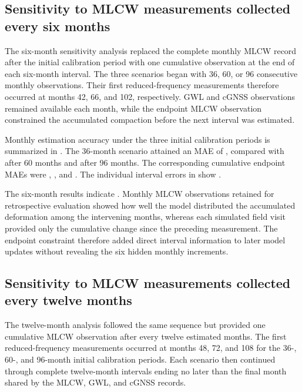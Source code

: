 \subsection{Sensitivity to MLCW measurements collected every six months}
\label{subsec:discussion_reduced_sampling}
\label{subsec:results_sparse_h6}

The six-month sensitivity analysis replaced the complete monthly MLCW record after the initial calibration period with one cumulative observation at the end of each six-month interval. The three scenarios began with 36, 60, or 96 consecutive monthly observations. Their first reduced-frequency measurements therefore occurred at months 42, 66, and 102, respectively. GWL and cGNSS observations remained available each month, while the endpoint MLCW observation constrained the accumulated compaction before the next interval was estimated.

Monthly estimation accuracy under the three initial calibration periods is summarized in . The 36-month scenario attained an MAE of , compared with  after 60 months and  after 96 months. The corresponding cumulative endpoint MAEs were , , and . The individual interval errors in  show .

The six-month results indicate . Monthly MLCW observations retained for retrospective evaluation showed how well the model distributed the accumulated deformation among the intervening months, whereas each simulated field visit provided only the cumulative change since the preceding measurement. The endpoint constraint therefore added direct interval information to later model updates without revealing the six hidden monthly increments.

\subsection{Sensitivity to MLCW measurements collected every twelve months}
\label{subsec:results_sparse_h12}

The twelve-month analysis followed the same sequence but provided one cumulative MLCW observation after every twelve estimated months. The first reduced-frequency measurements occurred at months 48, 72, and 108 for the 36-, 60-, and 96-month initial calibration periods. Each scenario then continued through complete twelve-month intervals ending no later than the final month shared by the MLCW, GWL, and cGNSS records.

